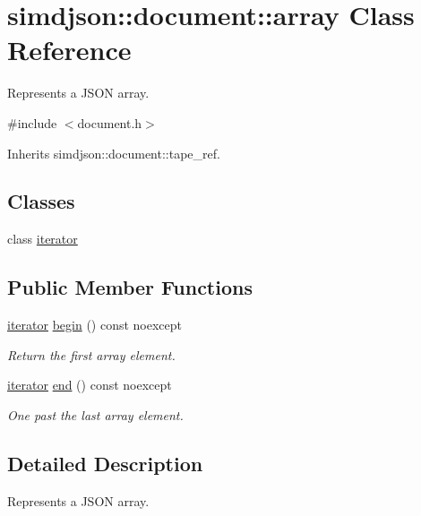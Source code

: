 \hypertarget{classsimdjson_1_1document_1_1array}{}\section{simdjson\+:\+:document\+:\+:array Class Reference}
\label{classsimdjson_1_1document_1_1array}


Represents a J\+S\+ON array.  




{\ttfamily \#include $<$document.\+h$>$}



Inherits simdjson\+::document\+::tape\+\_\+ref.

\subsection*{Classes}
\begin{DoxyCompactItemize}
\item 
class \hyperlink{classsimdjson_1_1document_1_1array_1_1iterator}{iterator}
\end{DoxyCompactItemize}
\subsection*{Public Member Functions}
\begin{DoxyCompactItemize}
\item 
\hyperlink{classsimdjson_1_1document_1_1array_1_1iterator}{iterator} \hyperlink{classsimdjson_1_1document_1_1array_ad5c3c380c55098b2266a311369819b8c}{begin} () const noexcept
\begin{DoxyCompactList}\small\item\em Return the first array element. \end{DoxyCompactList}\item 
\hyperlink{classsimdjson_1_1document_1_1array_1_1iterator}{iterator} \hyperlink{classsimdjson_1_1document_1_1array_ab63f33e3cf8283595472fe6e1325ced8}{end} () const noexcept
\begin{DoxyCompactList}\small\item\em One past the last array element. \end{DoxyCompactList}\end{DoxyCompactItemize}


\subsection{Detailed Description}
Represents a J\+S\+ON array. 

